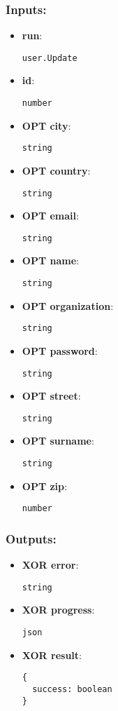 \subsubsection*{Inputs:}
\begin{itemize}
  \small
    \item \textbf{run}: 
\begin{lstlisting}
user.Update
\end{lstlisting}
    \item \textbf{id}: 
\begin{lstlisting}
number
\end{lstlisting}
    \item \textbf{OPT city}: 
\begin{lstlisting}
string
\end{lstlisting}
    \item \textbf{OPT country}: 
\begin{lstlisting}
string
\end{lstlisting}
    \item \textbf{OPT email}: 
\begin{lstlisting}
string
\end{lstlisting}
    \item \textbf{OPT name}: 
\begin{lstlisting}
string
\end{lstlisting}
    \item \textbf{OPT organization}: 
\begin{lstlisting}
string
\end{lstlisting}
    \item \textbf{OPT password}: 
\begin{lstlisting}
string
\end{lstlisting}
    \item \textbf{OPT street}: 
\begin{lstlisting}
string
\end{lstlisting}
    \item \textbf{OPT surname}: 
\begin{lstlisting}
string
\end{lstlisting}
    \item \textbf{OPT zip}: 
\begin{lstlisting}
number
\end{lstlisting}
  \end{itemize}
\subsubsection*{Outputs:}
\begin{itemize}
  \small
    \item \textbf{XOR error}: 
\begin{lstlisting}
string
\end{lstlisting}
    \item \textbf{XOR progress}: 
\begin{lstlisting}
json
\end{lstlisting}
    \item \textbf{XOR result}: 
\begin{lstlisting}
{
  success: boolean
}
\end{lstlisting}
  \end{itemize}

